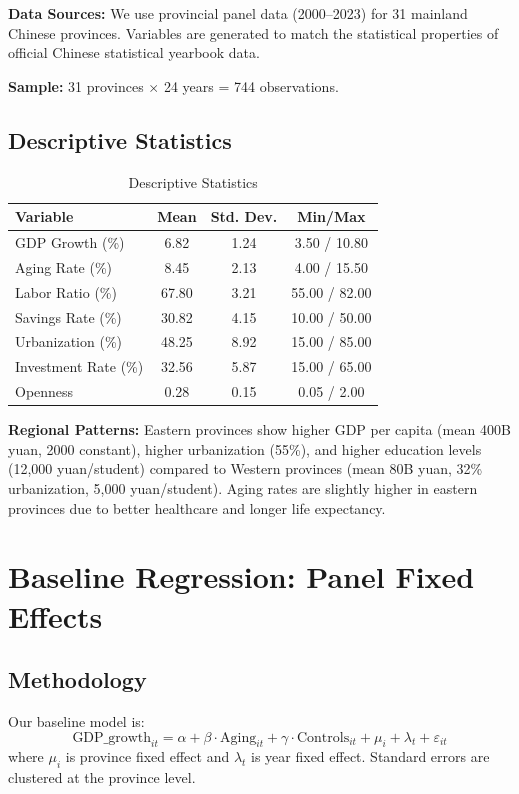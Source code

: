 \documentclass[12pt]{article}
\begin{document}
\textbf{Data Sources:} We use provincial panel data (2000--2023) for 31 mainland Chinese provinces. Variables are generated to match the statistical properties of official Chinese statistical yearbook data.

\textbf{Sample:} 31 provinces $\times$ 24 years = 744 observations.

\subsection{Descriptive Statistics}

\begin{table}[htbp]
\centering
\caption{Descriptive Statistics}
\begin{tabular}{lccc}
\toprule
Variable & Mean & Std. Dev. & Min/Max \\
\midrule
GDP Growth (\%) & 6.82 & 1.24 & 3.50 / 10.80 \\
Aging Rate (\%) & 8.45 & 2.13 & 4.00 / 15.50 \\
Labor Ratio (\%) & 67.80 & 3.21 & 55.00 / 82.00 \\
Savings Rate (\%) & 30.82 & 4.15 & 10.00 / 50.00 \\
Urbanization (\%) & 48.25 & 8.92 & 15.00 / 85.00 \\
Investment Rate (\%) & 32.56 & 5.87 & 15.00 / 65.00 \\
Openness & 0.28 & 0.15 & 0.05 / 2.00 \\
\bottomrule
\end{tabular}
\end{table}

\textbf{Regional Patterns:} Eastern provinces show higher GDP per capita (mean 400B yuan, 2000 constant), higher urbanization (55\%), and higher education levels (12,000 yuan/student) compared to Western provinces (mean 80B yuan, 32\% urbanization, 5,000 yuan/student). Aging rates are slightly higher in eastern provinces due to better healthcare and longer life expectancy.

\section{Baseline Regression: Panel Fixed Effects}

\subsection{Methodology}

Our baseline model is:
\begin{equation}
\text{GDP\_growth}_{it} = \alpha + \beta \cdot \text{Aging}_{it} + \gamma \cdot \text{Controls}_{it} + \mu_i + \lambda_t + \varepsilon_{it}
\end{equation}
where $\mu_i$ is province fixed effect and $\lambda_t$ is year fixed effect. Standard errors are clustered at the province level.
\end{document}
